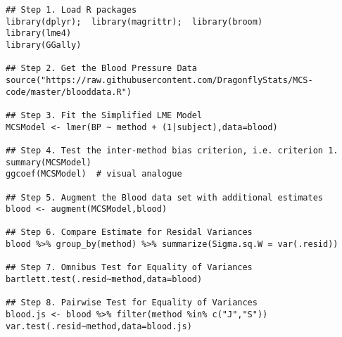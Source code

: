 \documentclass[12pt, a4paper]{report}
\theoremstyle{plain}
\theoremstyle{definition}
\theoremstyle{remark}
\begin{document}
\begin{verbatim}
## Step 1. Load R packages
library(dplyr);  library(magrittr);  library(broom)
library(lme4)
library(GGally)

## Step 2. Get the Blood Pressure Data
source("https://raw.githubusercontent.com/DragonflyStats/MCS-code/master/blooddata.R")

## Step 3. Fit the Simplified LME Model
MCSModel <- lmer(BP ~ method + (1|subject),data=blood)

## Step 4. Test the inter-method bias criterion, i.e. criterion 1.
summary(MCSModel)
ggcoef(MCSModel)  # visual analogue

## Step 5. Augment the Blood data set with additional estimates
blood <- augment(MCSModel,blood)

## Step 6. Compare Estimate for Residal Variances
blood %>% group_by(method) %>% summarize(Sigma.sq.W = var(.resid)) 

## Step 7. Omnibus Test for Equality of Variances
bartlett.test(.resid~method,data=blood)

## Step 8. Pairwise Test for Equality of Variances
blood.js <- blood %>% filter(method %in% c("J","S"))
var.test(.resid~method,data=blood.js)

\end{verbatim}



\end{document}
